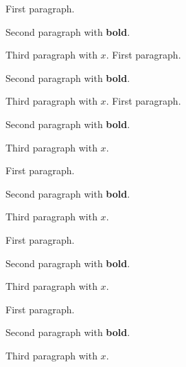 First paragraph.

Second paragraph with \textbf{bold}.

Third paragraph with $x$.
First paragraph.

Second paragraph with \textbf{bold}.

Third paragraph with $x$.
First paragraph.

Second paragraph with \textbf{bold}.

Third paragraph with $x$.
\begin{frame}[t]
First paragraph.

Second paragraph with \textbf{bold}.

Third paragraph with $x$.
\end{frame}

\begin{frame}[t]
First paragraph.

Second paragraph with \textbf{bold}.

Third paragraph with $x$.
\end{frame}

\begin{frame}[t]
First paragraph.

Second paragraph with \textbf{bold}.

Third paragraph with $x$.
\end{frame}

